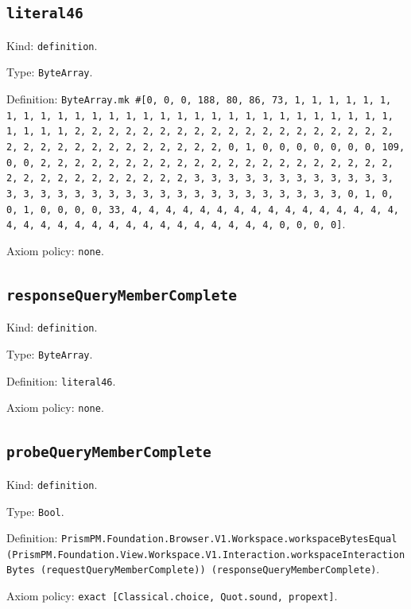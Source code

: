 \documentclass[11pt]{article}
\begin{document}
\subsection*{\texttt{literal46}}
\noindent Kind: \texttt{definition}.\par
\noindent Type: \texttt{ByteArray}.\par
\noindent Definition: \texttt{ByteArray.mk \#[0, 0, 0, 188, 80, 86, 73, 1, 1, 1, 1, 1, 1, 1, 1, 1, 1, 1, 1, 1, 1, 1, 1, 1, 1, 1, 1, 1, 1, 1, 1, 1, 1, 1, 1, 1, 1, 1, 1, 1, 2, 2, 2, 2, 2, 2, 2, 2, 2, 2, 2, 2, 2, 2, 2, 2, 2, 2, 2, 2, 2, 2, 2, 2, 2, 2, 2, 2, 2, 2, 2, 2, 0, 1, 0, 0, 0, 0, 0, 0, 0, 109, 0, 0, 2, 2, 2, 2, 2, 2, 2, 2, 2, 2, 2, 2, 2, 2, 2, 2, 2, 2, 2, 2, 2, 2, 2, 2, 2, 2, 2, 2, 2, 2, 2, 2, 3, 3, 3, 3, 3, 3, 3, 3, 3, 3, 3, 3, 3, 3, 3, 3, 3, 3, 3, 3, 3, 3, 3, 3, 3, 3, 3, 3, 3, 3, 3, 3, 0, 1, 0, 0, 1, 0, 0, 0, 0, 33, 4, 4, 4, 4, 4, 4, 4, 4, 4, 4, 4, 4, 4, 4, 4, 4, 4, 4, 4, 4, 4, 4, 4, 4, 4, 4, 4, 4, 4, 4, 4, 4, 0, 0, 0, 0]}.\par
\noindent Axiom policy: \texttt{none}.\par
\subsection*{\texttt{responseQueryMemberComplete}}
\noindent Kind: \texttt{definition}.\par
\noindent Type: \texttt{ByteArray}.\par
\noindent Definition: \texttt{literal46}.\par
\noindent Axiom policy: \texttt{none}.\par
\subsection*{\texttt{probeQueryMemberComplete}}
\noindent Kind: \texttt{definition}.\par
\noindent Type: \texttt{Bool}.\par
\noindent Definition: \texttt{PrismPM.Foundation.Browser.V1.Workspace.workspaceBytesEqual (PrismPM.Foundation.View.Workspace.V1.Interaction.workspaceInteractionBytes (requestQueryMemberComplete)) (responseQueryMemberComplete)}.\par
\noindent Axiom policy: \texttt{exact [Classical.choice, Quot.sound, propext]}.\par
\end{document}
